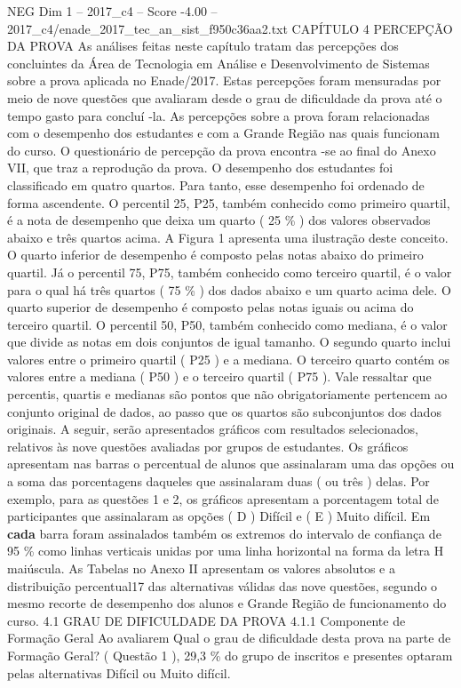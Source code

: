 \begin{textsample}{NEG Dim 1 – 2017\_c4 – Score -4.00 – 2017\_c4/enade\_2017\_tec\_an\_sist\_f950c36aa2.txt}  \label{ex:f1_neg_167}
CAPÍTULO 4 PERCEPÇÃO DA PROVA As análises feitas neste capítulo tratam das percepções dos concluintes da Área de Tecnologia em Análise e Desenvolvimento de Sistemas sobre a prova aplicada no Enade/2017.
Estas percepções foram mensuradas por meio de nove questões que avaliaram desde o grau de dificuldade da prova até o tempo gasto para concluí -la.
As percepções sobre a prova foram relacionadas com o desempenho dos estudantes e com a Grande Região nas quais funcionam do curso.
O questionário de percepção da prova encontra -se ao final do Anexo VII, que traz a reprodução da prova.
O desempenho dos estudantes foi classificado em quatro quartos.
Para tanto, esse desempenho foi ordenado de forma ascendente.
O percentil 25, P25, também conhecido como primeiro quartil, é a nota de desempenho que deixa um quarto ( 25 \% ) dos valores observados abaixo e três quartos acima.
A Figura 1 apresenta uma ilustração deste conceito.
O quarto inferior de desempenho é composto pelas notas abaixo do primeiro quartil.
Já o percentil 75, P75, também conhecido como terceiro quartil, é o valor para o qual há três quartos ( 75 \% ) dos dados abaixo e um quarto acima dele.
O quarto superior de desempenho é composto pelas notas iguais ou acima do terceiro quartil.
O percentil 50, P50, também conhecido como mediana, é o valor que divide as notas em dois conjuntos de igual tamanho.
O segundo quarto inclui valores entre o primeiro quartil ( P25 ) e a mediana.
O terceiro quarto contém os valores entre a mediana ( P50 ) e o terceiro quartil ( P75 ).
Vale ressaltar que percentis, quartis e medianas são pontos que não obrigatoriamente pertencem ao conjunto original de dados, ao passo que os quartos são subconjuntos dos dados originais.
A seguir, serão apresentados gráficos com resultados selecionados, relativos às nove questões avaliadas por grupos de estudantes.
Os gráficos apresentam nas barras o percentual de alunos que assinalaram uma das opções ou a soma das porcentagens daqueles que assinalaram duas ( ou três ) delas.
Por exemplo, para as questões 1 e 2, os gráficos apresentam a porcentagem total de participantes que assinalaram as opções ( D ) Difícil e ( E ) Muito difícil.
Em \textbf{cada} barra foram assinalados também os extremos do intervalo de confiança de 95 \% como linhas verticais unidas por uma linha horizontal na forma da letra H maiúscula.
As Tabelas no Anexo II apresentam os valores absolutos e a distribuição percentual17 das alternativas válidas das nove questões, segundo o mesmo recorte de desempenho dos alunos e Grande Região de funcionamento do curso. 4.1 GRAU DE DIFICULDADE DA PROVA 4.1.1 Componente de Formação Geral Ao avaliarem Qual o grau de dificuldade desta prova na parte de Formação Geral? ( Questão 1 ), 29,3 \% do grupo de inscritos e presentes optaram pelas alternativas Difícil ou Muito difícil.

\end{textsample}
